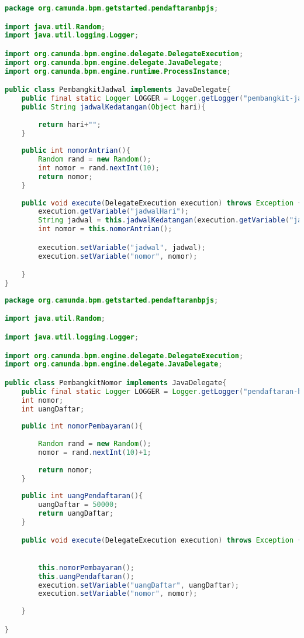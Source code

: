 \begin{lstlisting}[language=Java,basicstyle=\tiny,caption=PembangkitJadwal.java]
package org.camunda.bpm.getstarted.pendaftaranbpjs;

import java.util.Random;
import java.util.logging.Logger;

import org.camunda.bpm.engine.delegate.DelegateExecution;
import org.camunda.bpm.engine.delegate.JavaDelegate;
import org.camunda.bpm.engine.runtime.ProcessInstance;

public class PembangkitJadwal implements JavaDelegate{
	public final static Logger LOGGER = Logger.getLogger("pembangkit-jadwal");
	public String jadwalKedatangan(Object hari){
		
		return hari+"";
	}
	
	public int nomorAntrian(){
		Random rand = new Random();
		int nomor = rand.nextInt(10);
		return nomor;
	}
	
	public void execute(DelegateExecution execution) throws Exception {
		execution.getVariable("jadwalHari");
		String jadwal = this.jadwalKedatangan(execution.getVariable("jadwalHari"));
		int nomor = this.nomorAntrian();

		execution.setVariable("jadwal", jadwal);
		execution.setVariable("nomor", nomor);

	}
}

\end{lstlisting}

\begin{lstlisting}[language=Java,basicstyle=\tiny,caption=PembangkitNomor.java]
package org.camunda.bpm.getstarted.pendaftaranbpjs;

import java.util.Random;

import java.util.logging.Logger;

import org.camunda.bpm.engine.delegate.DelegateExecution;
import org.camunda.bpm.engine.delegate.JavaDelegate;

public class PembangkitNomor implements JavaDelegate{
	public final static Logger LOGGER = Logger.getLogger("pendaftaran-bpjs");
	int nomor;
	int uangDaftar;
	
	public int nomorPembayaran(){
		
		Random rand = new Random();
		nomor = rand.nextInt(10)+1;
		
		return nomor;
	}
	
	public int uangPendaftaran(){
		uangDaftar = 50000;
		return uangDaftar;
	}

	public void execute(DelegateExecution execution) throws Exception {

		
		this.nomorPembayaran();
		this.uangPendaftaran();
		execution.setVariable("uangDaftar", uangDaftar);
		execution.setVariable("nomor", nomor);
	
	}

}

\end{lstlisting}



